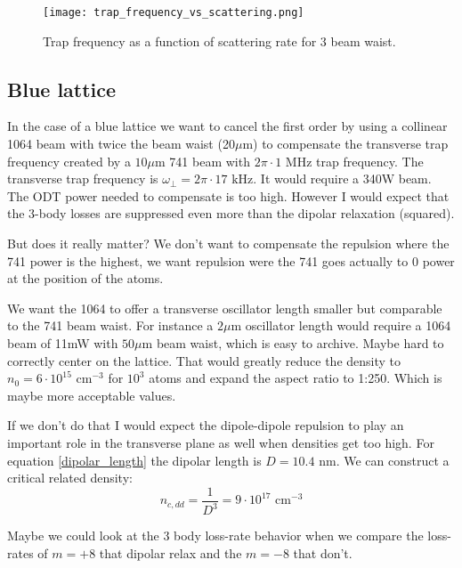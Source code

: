 \documentclass[reprint,amsmath,amssymb,aps,nofootinbib]{revtex4-1}
\begin{document}
\begin{figure}
\begin{center}
\centering
\texttt{[image: trap\_frequency\_vs\_scattering.png]}
\caption{\label{acceptable_scattering}Trap frequency as a function of scattering rate for 3 beam waist.}
\end{center}
\end{figure}

\subsection{Blue lattice}

In the case of a blue lattice we want to cancel the first order by using a collinear 1064 beam with twice the beam waist (20$\mu$m) to compensate the transverse trap frequency created by a $10\mu$m 741 beam with $2\pi\cdot 1\text{ MHz}$ trap frequency. The transverse trap frequency is $\omega_{\perp} = 2\pi\cdot 17\text{ kHz}$. It would require a 340W beam. The ODT power needed to compensate is too high. However I would expect that the 3-body losses are suppressed even more than the dipolar relaxation (squared). 

But does it really matter? We don't want to compensate the repulsion where the 741 power is the highest, we want repulsion were the 741 goes actually to 0 power at the position of the atoms.

We want the 1064 to offer a transverse oscillator length smaller but comparable to the 741 beam waist. For instance a $2\mu$m oscillator length would require a 1064 beam of 11mW with $50\mu$m beam waist, which is easy to archive. Maybe hard to correctly center on the lattice. That would greatly reduce the density to $n_{0} = 6\cdot10^{15}\text{ cm}^{-3}$ for $10^{3}$ atoms and expand the aspect ratio to 1:250. Which is maybe more acceptable values.

If we don't do that I would expect the dipole-dipole repulsion to play an important role in the transverse plane as well when densities get too high. For equation \ref{dipolar_length} the dipolar length is $D=10.4\text{ nm}$. We can construct a critical related density:
\begin{equation}
n_{c,dd}=\frac{1}{D^3} = 9\cdot 10^{17}\text{ cm}^{-3}
\end{equation}

Maybe we could look at the 3 body loss-rate behavior when we compare the loss-rates of $m=+8$ that dipolar relax and the $m=-8$ that don't.
\end{document}
